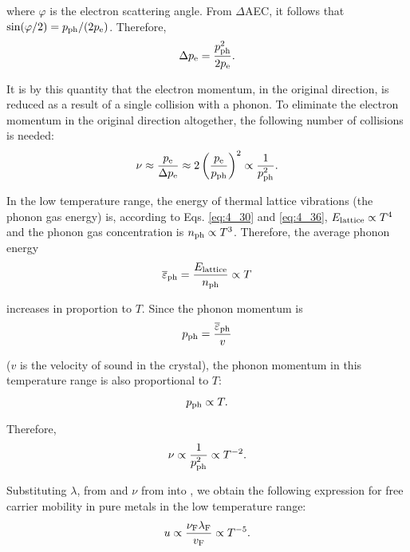 \noindent
where $\varphi$ is the electron scattering angle. From $\Delta$AEC, it follows that $\sin(\varphi/2)=p_{\text{ph}}/(2p_{\text{e}})$. Therefore,
\begin{equation*}
	\Delta{p_{\text{e}}} = \frac{p_{\text{ph}}^2}{2p_{\text{e}}}.
\end{equation*}

\noindent
It is by this quantity that the electron momentum, in the original direction, is reduced as a result of a single collision with a phonon. To eliminate the electron momentum in the original direction altogether, the following number of collisions is needed:
\begin{equation*}
	\nu \approx \frac{p_{\text{e}}}{\Delta{p_{\text{e}}}} \approx 2 \left(\frac{p_{\text{e}}}{p_{\text{ph}}}\right)^2 \propto \frac{1}{p_{\text{ph}}^2}.
\end{equation*}

In the low temperature range, the energy of thermal lattice vibrations (the phonon gas energy) is, according to Eqs. \eqref{eq:4_30} and \eqref{eq:4_36}, $E_{\text{lattice}}\propto T^4$ and the phonon gas concentration is $n_{\text{ph}}\propto T^3$. Therefore, the average phonon energy
\begin{equation*}
	\overline{\varepsilon}_{\text{ph}} = \frac{E_{\text{lattice}}}{n_{\text{ph}}} \propto T
\end{equation*}

\noindent
increases in proportion to $T$. Since the phonon momentum is
\begin{equation*}
	p_{\text{ph}} = \frac{\overline{\varepsilon}_{\text{ph}}}{v}
\end{equation*}

\noindent
($v$ is the velocity of sound in the crystal), the phonon momentum in this temperature range is also proportional to $T$:
\begin{equation}\label{eq:6_25}
	p_{\text{ph}} \propto T.
\end{equation}

\noindent
Therefore,
\begin{equation}\label{eq:6_26}
	\nu \propto \frac{1}{p_{\text{ph}}^2} \propto T^{-2}.
\end{equation}

\noindent
Substituting $\lambda$, from  and $\nu$ from  into , we obtain the following expression for free carrier mobility in pure metals in the low temperature range:
\begin{equation}\label{eq:6_27}
	u \propto \frac{\nu_{\text{F}} \lambda_{\text{F}}}{v_{\text{F}}} \propto T^{-5}.
\end{equation}

